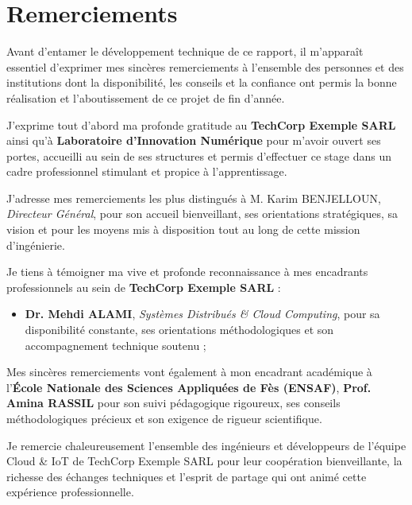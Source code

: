 \chapter*{Remerciements}

\noindent
Avant d'entamer le d\'eveloppement technique de ce rapport, il m'appara\^it essentiel d'exprimer mes sinc\`eres remerciements \`a l'ensemble des personnes et des institutions dont la disponibilit\'e, les conseils et la confiance ont permis la bonne r\'ealisation et l'aboutissement de ce projet de fin d'ann\'ee.

\vspace{0.4cm}

\noindent
J'exprime tout d'abord ma profonde gratitude au \textbf{TechCorp Exemple SARL} ainsi qu'\`a \textbf{Laboratoire d'Innovation Numérique} pour m'avoir ouvert ses portes, accueilli au sein de ses structures et permis d'effectuer ce stage dans un cadre professionnel stimulant et propice \`a l'apprentissage.
\vspace{0.4cm}

\noindent
J'adresse mes remerciements les plus distingu\'es \`a M. Karim BENJELLOUN, \textit{Directeur Général}, pour son accueil bienveillant, ses orientations strat\'egiques, sa vision et pour les moyens mis \`a disposition tout au long de cette mission d'ing\'enierie.
\vspace{0.4cm}

\noindent
Je tiens \`a t\'emoigner ma vive et profonde reconnaissance \`a mes encadrants professionnels au sein de \textbf{TechCorp Exemple SARL} :
\begin{itemize}
    \item \textbf{Dr. Mehdi ALAMI}, \textit{Systèmes Distribués \& Cloud Computing}, pour sa disponibilité constante, ses orientations méthodologiques et son accompagnement technique soutenu ;
\end{itemize}
\vspace{0.4cm}

\noindent
Mes sinc\`eres remerciements vont \'egalement \`a mon encadrant acad\'emique \`a l'\textbf{\'Ecole Nationale des Sciences Appliqu\'ees de F\`es (ENSAF)}, \textbf{Prof. Amina RASSIL} pour son suivi pédagogique rigoureux, ses conseils méthodologiques précieux et son exigence de rigueur scientifique.

\vspace{0.4cm}

\noindent
Je remercie chaleureusement l'ensemble des ingénieurs et développeurs de l'équipe Cloud \& IoT de TechCorp Exemple SARL pour leur coop\'eration bienveillante, la richesse des \'echanges techniques et l'esprit de partage qui ont anim\'e cette exp\'erience professionnelle.


